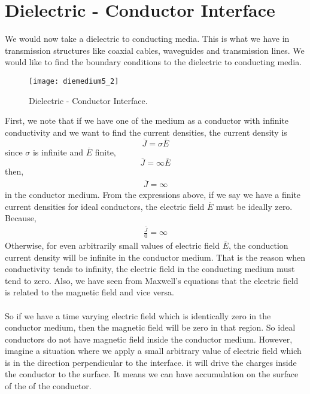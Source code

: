   \section{Dielectric - Conductor Interface}
  We would now take a dielectric to conducting media. This is what we have in transmission structures like coaxial cables, waveguides and transmission lines. We would like to find the boundary conditions to the dielectric to conducting media. 
  \begin{figure}[h]
  	\centering
  	\texttt{[image: diemedium5\_2]}
  	\caption{Dielectric - Conductor Interface.}
  \end{figure}
  First, we note that if we have one of the medium as a  conductor with infinite conductivity and we want to find the current densities, the current density is 
  \begin{equation}
  \overline{J} = \sigma\overline{E}
  \end{equation}
  since $\sigma$ is infinite and $\overline{E}$ finite,
  \begin{equation*}
  \overline{J} = \infty\overline{E}
  \end{equation*} 
  then,
  \begin{align*}
  \overline{J} = \infty
  \end{align*}
  in the conductor medium. From the expressions above, if we say we have a finite current densities for ideal conductors, the electric field $\overline{E}$ must be ideally zero. Because,
  \begin{align*}
  \frac{\overline{J}}{0} = \infty
  \end{align*}
  Otherwise, for even arbitrarily small values of electric field $\overline{E}$, the conduction current density will be infinite in the conductor medium. That is the reason when conductivity tends to infinity, the electric field in the conducting medium must tend to zero. Also, we have seen from Maxwell's equations that the electric field is related to the magnetic field and vice versa. \\ \\ 
  So if we have a time varying electric field which is identically zero in the conductor medium, then the magnetic field will be zero in that region. So ideal conductors do not have magnetic field inside the conductor medium. However, imagine a situation where we apply a small arbitrary value of electric field which is in the direction perpendicular to the interface. it will drive the charges inside the conductor to the surface. It means we can have accumulation on the surface of the of the conductor. \\ \\ 
